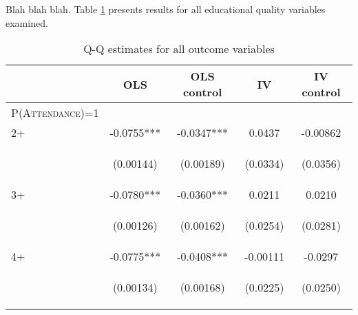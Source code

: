\documentclass{article}[11pt,subeqn]
\begin{document}
\begin{spacing}{1.25}
Blah blah blah.  Table \ref{tab:fertilityALL} presents results for all educational quality variables examined.
\begin{table}[!htbp]
\caption{Q-Q estimates for all outcome variables}
\label{tab:fertilityALL}
\begin{center}
\begin{tabular}{lcccc} \toprule 
& OLS & OLS control & IV & IV control \\ \midrule
\textsc{P(Attendance)=1} & & & & \\
2+ & -0.0755*** & -0.0347*** & 0.0437  & -0.00862 \\
\vspace{4pt} & \begin{footnotesize}(0.00144)\end{footnotesize} & \begin{footnotesize}(0.00189)\end{footnotesize} & \begin{footnotesize}(0.0334)\end{footnotesize} & \begin{footnotesize}(0.0356)\end{footnotesize} \\
3+ & -0.0780*** &	-0.0360*** & 0.0211 & 0.0210\\
\vspace{4pt} & \begin{footnotesize}(0.00126)\end{footnotesize} & \begin{footnotesize}(0.00162)\end{footnotesize} & \begin{footnotesize}(0.0254)\end{footnotesize} & \begin{footnotesize}(0.0281)\end{footnotesize} \\
4+ & -0.0775*** &	-0.0408*** & -0.00111 &	-0.0297\\
\vspace{4pt} & \begin{footnotesize}(0.00134)\end{footnotesize} & \begin{footnotesize}(0.00168)\end{footnotesize} & \begin{footnotesize}(0.0225)\end{footnotesize} & \begin{footnotesize}(0.0250)\end{footnotesize} \\

\end{tabular}
\end{center}
\end{table}
\end{spacing}
\end{document}
